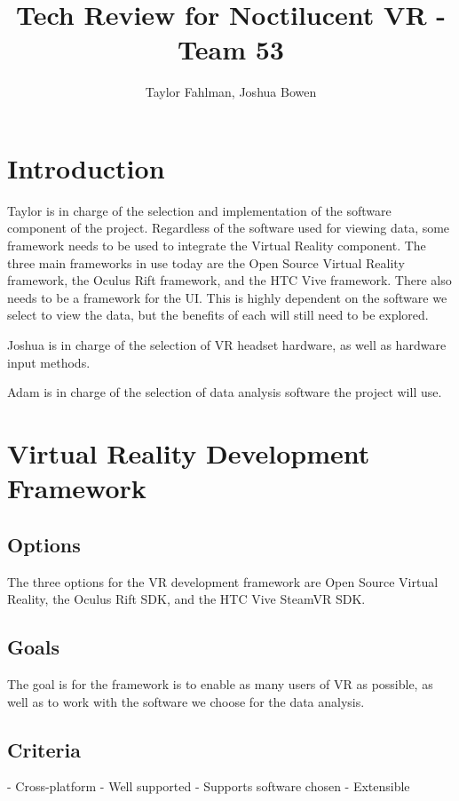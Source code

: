 \documentclass{article}
\begin{document}
\title {Tech Review for Noctilucent VR - Team 53}
\author {Taylor Fahlman, Joshua Bowen}

\maketitle
\newpage
\thispagestyle{empty}
\mbox{}


\section{Introduction}

Taylor is in charge of the selection and implementation of the software component of the project.
Regardless of the software used for viewing data, some framework needs to be used to integrate the Virtual Reality component.
The three main frameworks in use today are the Open Source Virtual Reality framework, the Oculus Rift framework, and the 
HTC Vive framework.
There also needs to be a framework for the UI. This is highly dependent on the software we select to view the data,
but the benefits of each will still need to be explored.

Joshua is in charge of the selection of VR headset hardware, as well as hardware input methods.

Adam is in charge of the selection of data analysis software the project will use.

\section{Virtual Reality Development Framework}

\subsection{Options}
The three options for the VR development framework are Open Source Virtual Reality, the Oculus Rift SDK,
and the HTC Vive SteamVR SDK.

\subsection{Goals}
The goal is for the framework is to enable as many users of VR as possible, as well as to work with
the software we choose for the data analysis. 

\subsection{Criteria}
- Cross-platform
- Well supported
- Supports software chosen
- Extensible
\end{document}
